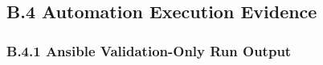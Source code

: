 \documentclass[11pt]{article}
\begin{document}

\subsection{B.4 Automation Execution Evidence}
\label{sec:appendix-b-automation-execution-evidence}


\subsubsection{B.4.1 Ansible Validation-Only Run Output}
\label{sec:appendix-b-ansible-validation-only-run-output}
\end{document}
